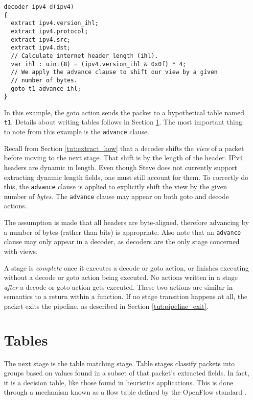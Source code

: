 \begin{codepage}
\begin{lstlisting}
decoder ipv4_d(ipv4)
{
  extract ipv4.version_ihl;
  extract ipv4.protocol;
  extract ipv4.src;
  extract ipv4.dst;
  // Calculate internet header length (ihl).
  var ihl : uint(8) = (ipv4.version_ihl & 0x0f) * 4;
  // We apply the advance clause to shift our view by a given
  // number of bytes.
  goto t1 advance ihl;
}
\end{lstlisting}
\end{codepage}

In this example, the goto action sends the packet to a hypothetical table
named \texttt{t1}. Details about writing tables follows in Section \ref{tut:table}. The most important thing to note from this example is the
\texttt{advance} clause.

Recall from Section \ref{tut:extract_how} that a decoder shifts the
\textit{view} of a packet before moving to the next stage. That shift is by the
length of the header. IPv4 headers are dynamic in length. Even though Steve does not
currently support extracting dynamic length fields, one must still account for
them. To correctly do this, the \texttt{advance} clause is applied to
explicitly shift the view by the given number of \textit{bytes}. The
\texttt{advance} clause may appear on both goto and decode actions.

The assumption is made that all headers are byte-aligned, therefore advancing by
a number of bytes (rather than bits) is appropriate. Also note that an
\texttt{advance} clause may only appear in a decoder, as decoders are the only
stage concerned with views.

A stage is \textit{complete} once it executes a decode or goto action, or
finishes executing without a decode or goto action being executed. No actions written in a stage
\textit{after} a decode or goto action gets executed. These two actions are similar in
semantics to a return within a function. If no stage transition happens at all,
the packet exits the pipeline, as described in Section \ref{tut:pipeline_exit}.

\section{Tables} \label{tut:table}

The next stage is the table matching stage. 
Table stages classify packets into groups based on values found in a subset of that packet's extracted fields. In fact, it is a decision table, like those found in heuristics applications. This is done
through a mechanism known as a flow table defined by the OpenFlow standard
\cite{openflow_spec}.

